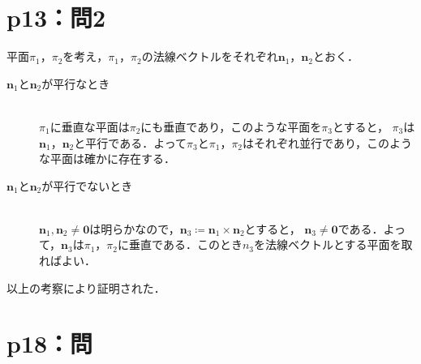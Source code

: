 \section*{p13：問2}

\begin{tproof}
  平面$\pi_1$，$\pi_2$を考え，$\pi_1$，$\pi_2$の法線ベクトルをそれぞれ$\bm{n}_1$，$\bm{n}_2$とおく．
  \begin{description}
    \item[$\bm{n}_1$と$\bm{n}_2$が平行なとき] \mbox{}\\
          $\pi_1$に垂直な平面は$\pi_2$にも垂直であり，このような平面を$\pi_3$とすると，
          $\pi_3$は$\bm{n}_1$，$\bm{n}_2$と平行である．よって$\pi_3$と$\pi_1$，$\pi_2$はそれぞれ並行であり，このような平面は確かに存在する．
    \item[$\bm{n}_1$と$\bm{n}_2$が平行でないとき] \mbox{} \\
          $\bm{n}_1 , \bm{n}_2 \ne \bm{0}$は明らかなので，$\bm{n}_3 \coloneqq \bm{n}_1 \times \bm{n}_2$とすると，
          $\bm{n}_3 \ne \bm{0}$である．よって，$\bm{n}_3$は$\pi_1$，$\pi_2$に垂直である．このとき$n_3$を法線ベクトルとする平面を取ればよい．
  \end{description}
  以上の考察により証明された．
\end{tproof}

%
%
%
\section*{p18：問}

